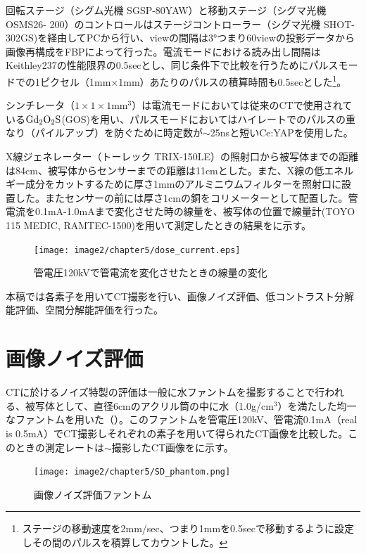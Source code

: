 回転ステージ（シグム光機 SGSP-80YAW）と移動ステージ（シグマ光機 OSMS26-
200）のコントロールはステージコントローラー（シグマ光機 SHOT-302GS)を経由してPCから行い、viewの間隔は3°つまり60viewの投影データから画像再構成をFBPによって行った。電流モードにおける読み出し間隔はKeithley237の性能限界の0.5secとし、同じ条件下で比較を行うためにパルスモードでの1ピクセル（1mm$\times$1mm）あたりのパルスの積算時間も0.5secとした\footnote{ステージの移動速度を2mm/sec、つまり1mmを0.5secで移動するように設定しその間のパルスを積算してカウントした。}。


シンチレータ（$1\times1\times1$mm$^3$）は電流モードにおいては従来のCTで使用されている$\rm Gd_2O_2S$(GOS)を用い、パルスモードにおいてはハイレートでのパルスの重なり（パイルアップ）を防ぐために時定数が$\sim$25nsと短いCe:YAPを使用した。

X線ジェネレーター（トーレック TRIX-150LE）の照射口から被写体までの距離は84cm、被写体からセンサーまでの距離は11cmとした。また、X線の低エネルギー成分をカットするために厚さ1mmのアルミニウムフィルターを照射口に設置した。またセンサーの前には厚さ1cmの銅をコリメーターとして配置した。管電流を0.1mA-1.0mAまで変化させた時の線量を、被写体の位置で線量計(TOYO 115 MEDIC, RAMTEC-1500)を用いて測定したときの結果をに示す。

\begin{figure}[H]
 \begin{center}
 \texttt{[image: image2/chapter5/dose\_current.eps]}
 \end{center}
 \caption{管電圧120kVで管電流を変化させたときの線量の変化}
 \label{fig:dose_current}
\end{figure}


本稿では各素子を用いてCT撮影を行い、画像ノイズ評価、低コントラスト分解能評価、空間分解能評価を行った。

\section{画像ノイズ評価}
CTに於けるノイズ特製の評価は一般に水ファントムを撮影することで行われる、被写体として、直径6cmのアクリル筒の中に水（1.0g/cm$^3$）を満たした均一なファントムを用いた（）。このファントムを管電圧120kV、管電流0.1mA（real is 0.5mA）でCT撮影しそれぞれの素子を用いて得られたCT画像を比較した。このときの測定レートは$\sim$撮影したCT画像をに示す。

\begin{figure}[H]
 \begin{center}
 \texttt{[image: image2/chapter5/SD\_phantom.png]} 
 \end{center}
 \caption{画像ノイズ評価ファントム}
 \label{fig:SD_phantom}
\end{figure}


